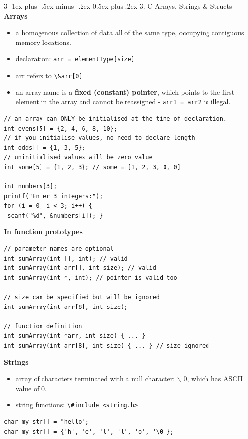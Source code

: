 \documentclass[12pt, landscape]{article}
\makeatletter
\newcommand{\code}[1]{\colorbox{gray!25!}{\lstinline[basicstyle=\scriptsize]|#1|}}
\renewcommand{\section}{\@startsection{section}{1}{0mm}%
                                {-1ex plus -.5ex minus -.2ex}%
                                {0.5ex plus .2ex}%
                                {\normalfont\large\bfseries}}
\makeatother
\begin{document}
\begin{multicols*}{3}
\section{3. C Arrays, Strings \& Structs}
\textbf{Arrays}
\begin{itemize}
	\item a homogenous collection of data all of the same type, occupying contiguous memory locations.
	\item  declaration: \code{arr = elementType[size]}
	\item arr refers to \code{\&arr[0]}
	\item an array name is a \textbf{fixed (constant) pointer}, which points to the first element in the array and cannot be reassigned - \code{arr1 = arr2} is illegal.
\end{itemize}
\begin{lstlisting}
// an array can ONLY be initialised at the time of declaration.
int evens[5] = {2, 4, 6, 8, 10};
// if you initialise values, no need to declare length
int odds[] = {1, 3, 5};
// uninitialised values will be zero value
int some[5] = {1, 2, 3}; // some = [1, 2, 3, 0, 0]

int numbers[3];
printf("Enter 3 integers:");
for (i = 0; i < 3; i++) {
 scanf("%d", &numbers[i]); }
\end{lstlisting}

\textbf{In function prototypes}
\begin{lstlisting}
// parameter names are optional
int sumArray(int [], int); // valid
int sumArray(int arr[], int size); // valid
int sumArray(int *, int); // pointer is valid too

// size can be specified but will be ignored
int sumArray(int arr[8], int size); 

// function definition
int sumArray(int *arr, int size) { ... }
int sumArray(int arr[8], int size) { ... } // size ignored
\end{lstlisting}

\textbf{Strings}
\begin{itemize}
\item array of characters terminated with a null character: $\backslash$ 0, which has ASCII value of 0.
\item string functions: \code{\#include <string.h>}
\end{itemize}

\begin{lstlisting}
char my_str[] = "hello";
char my_str[] = {'h', 'e', 'l', 'l', 'o', '\0'};
\end{lstlisting}


\end{multicols*}
\end{document}
